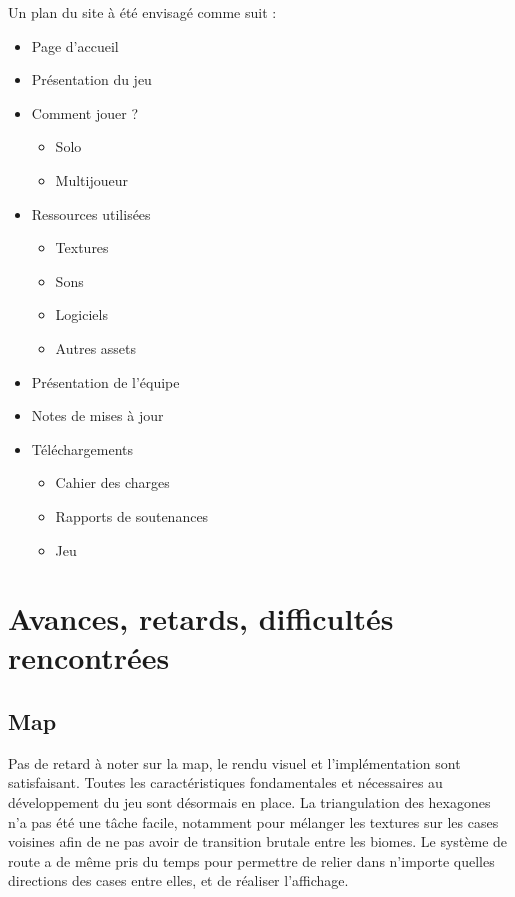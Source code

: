 \documentclass[12pt]{report}
\begin{document}
\newpage

Un plan du site à été envisagé comme suit :

\begin{itemize}
\item Page d'accueil
\item Présentation du jeu
\item Comment jouer ?
    \begin{itemize}
    \item Solo
    \item Multijoueur
    \end{itemize}
\item Ressources utilisées
    \begin{itemize}
    \item Textures
    \item Sons
    \item Logiciels
    \item Autres assets
    \end{itemize}
\item Présentation de l'équipe
\item Notes de mises à jour
\item Téléchargements
    \begin{itemize}
    \item Cahier des charges
    \item Rapports de soutenances
    \item Jeu
    \end{itemize}
\end{itemize}

\chapter{Avances, retards, difficultés rencontrées}

\section*{Map}

Pas de retard à noter sur la map, le rendu visuel et l’implémentation sont satisfaisant. Toutes les caractéristiques fondamentales et nécessaires au développement du jeu sont désormais en place. La triangulation des hexagones n’a pas été une tâche facile, notamment pour mélanger les textures sur les cases voisines afin de ne pas avoir de transition brutale entre les biomes. Le système de route a de même pris du temps pour permettre de relier dans n’importe quelles directions des cases entre elles, et de réaliser l’affichage.
\end{document}
